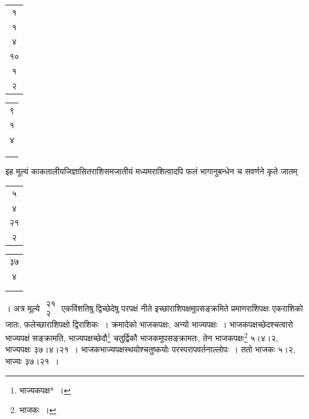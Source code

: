 \documentclass[10pt, openany]{book}
\begin{document}
{{\vspace{0.3cm}{उदाहरणम्\textemdash}

\vspace{0.3cm}{त्रैराशिकीये तावच्चन्दनपलं सकर्षमित्यादि~। न्यासः\textemdash}

\vspace{0.2cm}
\hspace{40mm} \begin{tabular}{c|}१ \\
 १ \\
 ४ \\ १० \\ 
 १ \\
२\end{tabular}
\begin{tabular}{c}
 ९\\
 १ \\
 ४ \\
 \\ 
 \\
 \\
 \end{tabular}

{इह मूल्यं काकतालीयजिज्ञासितराशिसमजातीयं मध्यमराशित्वादपि फलं
भागानुबन्धेन}
च सवर्णने कृते जातम् \begin{tabular}{c|}५\\ ४\\ २१\\२\end{tabular}\begin{tabular}{c} ३७\\ ४ \\ 
\\ 
\\ \end{tabular}। अत्र मूल्ये $\begin{matrix}

\mbox{{२१}}\\

\mbox{{२}}

\end{matrix}$ एकविंशतिषु द्विच्छेदेषु परपक्षं नीते इच्छाराशिपक्षमुपसङ्क्रमिते प्रमाणराशिपक्षः एकराशिको जातः, फलेच्छाराशिपक्षो
द्विराशिकः~।
{क्रमादेको भाजकपक्षः, अन्यो भाज्यपक्षः~। भाजकपक्षच्छेदश्चत्वारो
भाज्यपक्षं सङ्क्रामति,}
{भाज्यपक्षच्छेदौ\renewcommand{\thefootnote}{\s ६}\footnote{\s भाज्यकपक्ष*~।} चतुर्द्विकौ भाजकमुपसङ्क्रामतः, तेन भाजकपक्षः\renewcommand{\thefootnote}{\s ७}\footnote{\s भाजकः~।}
५।४।२, भाज्यपक्षः ३७।४।२१~।}
{भाजकभाज्यपक्षस्थयोश्चतुष्कयोः परस्परापवर्तनाल्लोपः~। ततो भाजकः ५।२,
भाज्यः ३७।२१~।}


}}
\end{document}
